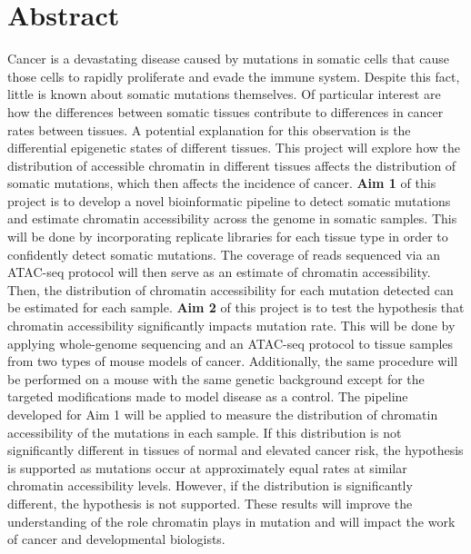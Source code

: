 \documentclass[12pt]{article}
\begin{document}
\section{Abstract}
Cancer is a devastating disease caused by mutations in somatic cells that cause those cells to rapidly proliferate and evade the immune system.
Despite this fact, little is known about somatic mutations themselves.
Of particular interest are how the differences between somatic tissues contribute to differences in cancer rates between tissues.
A potential explanation for this observation is the differential epigenetic states of different tissues.
This project will explore how the distribution of accessible chromatin in different tissues affects the distribution of somatic mutations, which then affects the incidence of cancer.
\textbf{Aim 1} of this project is to develop a novel bioinformatic pipeline to detect somatic mutations and estimate chromatin accessibility across the genome in somatic samples.
This will be done by incorporating replicate libraries for each tissue type in order to confidently detect somatic mutations.
The coverage of reads sequenced via an ATAC-seq protocol will then serve as an estimate of chromatin accessibility.
Then, the distribution of chromatin accessibility for each mutation detected can be estimated for each sample.
\textbf{Aim 2} of this project is to test the hypothesis that chromatin accessibility significantly impacts mutation rate.
This will be done by applying whole-genome sequencing and an ATAC-seq protocol to tissue samples from two types of mouse models of cancer.
Additionally, the same procedure will be performed on a mouse with the same genetic background except for the targeted modifications made to model disease as a control.
The pipeline developed for Aim 1 will be applied to measure the distribution of chromatin accessibility of the mutations in each sample.
If this distribution is not significantly different in tissues of normal and elevated cancer risk, the hypothesis is supported as mutations occur at approximately equal rates at similar chromatin accessibility levels.
However, if the distribution is significantly different, the hypothesis is not supported.
These results will improve the understanding of the role chromatin plays in mutation and will impact the work of cancer and developmental biologists.
\end{document}

